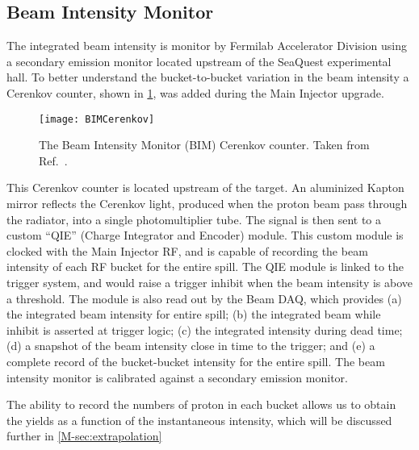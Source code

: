 \documentclass[../main.tex]{subfiles}
\begin{document}
\subsection{Beam Intensity Monitor}
\label{subsec:BIM}
The integrated beam intensity is monitor by Fermilab Accelerator Division using a
secondary emission monitor located upstream of the SeaQuest experimental hall.
To better understand the bucket-to-bucket variation in the beam intensity a Cerenkov counter,
shown in \cref{fig:BIM}, was added during the Main Injector upgrade.
\begin{figure}[htbp!]
	\centering
	\texttt{[image: BIMCerenkov]}
	\caption{The Beam Intensity Monitor (BIM) Cerenkov counter. Taken from Ref.\
		\cite{aidala2019}.}
	\label{fig:BIM}
\end{figure}
This Cerenkov counter is located upstream of the target.
An aluminized Kapton mirror reflects the Cerenkov light, produced when the proton beam
pass through the radiator, into a single photomultiplier tube. The signal is then
sent to a custom ``QIE'' (Charge Integrator and Encoder) module. This custom module
is clocked with the Main Injector RF, and is capable of recording the beam intensity
of each RF bucket for the entire spill. The QIE module is linked to the trigger
system, and would raise a trigger inhibit when the beam intensity is above a
threshold. The module is also read out by the Beam DAQ, which provides (a) the
integrated beam intensity for entire spill; (b) the integrated beam while inhibit is
asserted at trigger logic; (c) the integrated intensity during dead time; (d) a snapshot
of the beam intensity close in time to the trigger; and (e) a complete record of the
bucket-bucket intensity for the entire spill. The beam intensity monitor is calibrated
against a secondary emission monitor.

The ability to record the numbers of proton in each bucket allows us to obtain the
yields as a function of the instantaneous intensity, which will be discussed
further in \cref{M-sec:extrapolation}
\end{document}
